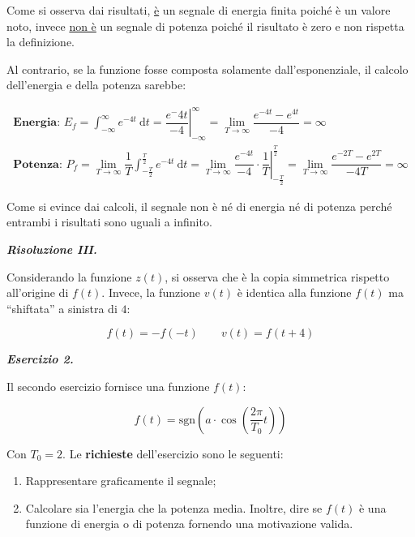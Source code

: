 \documentclass[a4paper]{article}
\begin{document}
	\noindent
	Come si osserva dai risultati, \underline{è} un segnale di energia finita poiché è un valore noto, invece \underline{non è} un segnale di potenza poiché il risultato è zero e non rispetta la definizione.
	
	Al contrario, se la funzione fosse composta solamente dall'esponenziale, il calcolo dell'energia e della potenza sarebbe:
	
	\begin{gather*}
		\textbf{Energia: } E_{f} = \int_{-\infty}^{\infty}{e^{-4t}\:\mathrm{d}t} = \left.\dfrac{e^-4t}{-4}\right\vert_{-\infty}^{\infty} = \lim_{T\rightarrow\infty}{\dfrac{e^{-4t} - e^{4t}}{-4}} = \infty \\
		\textbf{Potenza: } P_{f} = \lim_{T\rightarrow\infty}{\dfrac{1}{T} \int_{-\frac{T}{2}}^{\frac{T}{2}}{e^{-4t}\:\mathrm{d}t}} = \lim_{T\rightarrow\infty}\left.\dfrac{e^{-4t}}{-4}\cdot\dfrac{1}{T}\right\vert_{-\frac{T}{2}}^{\frac{T}{2}} = \lim_{T\rightarrow\infty}\dfrac{e^{-2T} - e^{2T}}{-4T} = \infty
	\end{gather*}

	\noindent
	Come si evince dai calcoli, il segnale non è né di energia né di potenza perché entrambi i risultati sono uguali a infinito.\newline
	
	\noindent
	\textcolor{Green4}{\textbf{\emph{Risoluzione III.}}}
	
	Considerando la funzione $z(t)$, si osserva che è la copia simmetrica rispetto all'origine di $f(t)$. Invece, la funzione $v(t)$ è identica alla funzione $f(t)$ ma ``shiftata'' a sinistra di $4$:
	
	\begin{equation*}
		f(t) = -f(-t) \hspace{2em} v(t) = f(t + 4)
	\end{equation*}

	\newpage
	
	\noindent
	\textcolor{Red3}{\textbf{\emph{Esercizio 2.}}}
	
	\noindent
	Il secondo esercizio fornisce una funzione $f(t)$:
	
	\begin{equation*}
		f(t) = \mathrm{sgn }\left(a\cdot\cos{\left(\dfrac{2\pi}{T_0} t\right)}\right)
	\end{equation*}
	
	\noindent
	Con $T_0 = 2$. Le \textbf{richieste} dell'esercizio sono le seguenti:
	
	\begin{enumerate}[label=\Roman*]
		\item Rappresentare graficamente il segnale;
		
		\item Calcolare sia l'energia che la potenza media. Inoltre, dire se $f(t)$ è una funzione di energia o di potenza fornendo una motivazione valida.
	\end{enumerate}
	
\end{document}
